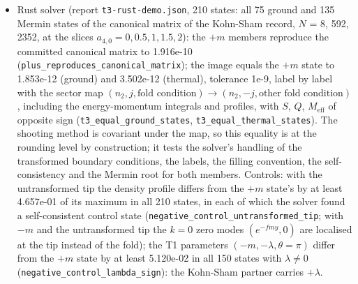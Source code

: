 \documentclass[11pt]{article}
\begin{document}
\begin{itemize}
\item Rust solver (report \texttt{t3-rust-\allowbreak{}demo.jso\allowbreak{}n}, 210 states: all 75 ground and 135 Mermin states of the canonical matrix of the Kohn-Sham record, $N$ = 8, 592, 2352, at the slices $a_{4,0} = 0, 0.5, 1, 1.5, 2$): the $+m$ members reproduce the committed canonical matrix to 1.916e-10 (\texttt{plus\_rep\allowbreak{}roduces\_\allowbreak{}canonica\allowbreak{}l\_matrix}); the image equals the $+m$ state to 1.853e-12 (ground) and 3.502e-12 (thermal), tolerance 1e-9, label by label with the sector map $(n_2, j, \text{fold condition}) \to (n_2, -j, \text{other fold condition})$, including the energy-momentum integrals and profiles, with $S$, $Q$, $M_{\mathrm{eff}}$ of opposite sign (\texttt{t3\_equal\allowbreak{}\_ground\_\allowbreak{}states}, \texttt{t3\_equal\allowbreak{}\_thermal\allowbreak{}\_states}). The shooting method is covariant under the map, so this equality is at the rounding level by construction; it tests the solver's handling of the transformed boundary conditions, the labels, the filling convention, the self-consistency and the Mermin root for both members. Controls: with the untransformed tip the density profile differs from the $+m$ state's by at least 4.657e-01 of its maximum in all 210 states, in each of which the solver found a self-consistent control state (\texttt{negative\allowbreak{}\_control\allowbreak{}\_untrans\allowbreak{}formed\_t\allowbreak{}ip}; with $-m$ and the untransformed tip the $k = 0$ zero modes $(e^{-fmy}, 0)$ are localised at the tip instead of the fold); the T1 parameters $(-m,-\lambda,\theta = \pi)$ differ from the $+m$ state by at least 5.120e-02 in all 150 states with $\lambda \neq 0$ (\texttt{negative\allowbreak{}\_control\allowbreak{}\_lambda\_\allowbreak{}sign}): the Kohn-Sham partner carries $+\lambda$.

\end{itemize}
\end{document}
